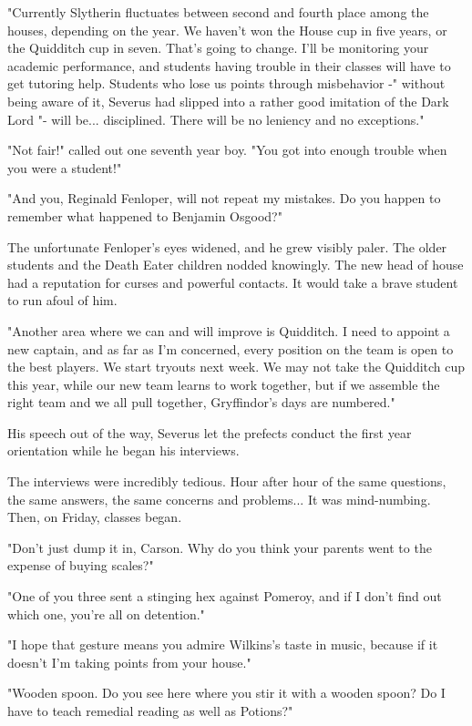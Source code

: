 \documentclass[a4paper,11pt]{article}
\begin{document}
"Currently Slytherin fluctuates between second and fourth place among the houses, depending on the year. We haven't won the House cup in five years, or the Quidditch cup in seven. That's going to change. I'll be monitoring your academic performance, and students having trouble in their classes will have to get tutoring help. Students who lose us points through misbehavior -" without being aware of it, Severus had slipped into a rather good imitation of the Dark Lord "- will be... disciplined. There will be no leniency and no exceptions."

"Not fair!" called out one seventh year boy. "You got into enough trouble when you were a student!"

"And you, Reginald Fenloper, will not repeat my mistakes. Do you happen to remember what happened to Benjamin Osgood?"

The unfortunate Fenloper's eyes widened, and he grew visibly paler. The older students and the Death Eater children nodded knowingly. The new head of house had a reputation for curses and powerful contacts. It would take a brave student to run afoul of him.

"Another area where we can and will improve is Quidditch. I need to appoint a new captain, and as far as I'm concerned, every position on the team is open to the best players. We start tryouts next week. We may not take the Quidditch cup this year, while our new team learns to work together, but if we assemble the right team and we all pull together, Gryffindor's days are numbered."

His speech out of the way, Severus let the prefects conduct the first year orientation while he began his interviews.

The interviews were incredibly tedious. Hour after hour of the same questions, the same answers, the same concerns and problems... It was mind-numbing. Then, on Friday, classes began.

"Don't just dump it in, Carson. Why do you think your parents went to the expense of buying scales?"

"One of you three sent a stinging hex against Pomeroy, and if I don't find out which one, you're all on detention."

"I hope that gesture means you admire Wilkins's taste in music, because if it doesn't I'm taking points from your house."

"Wooden spoon. Do you see here where you stir it with a wooden spoon? Do I have to teach remedial reading as well as Potions?"
\end{document}
